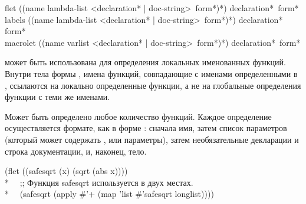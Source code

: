 \begin{defmac}
flet ({(name lambda-list
        <{declaration}* | doc-string> {\,form}*)}*)
     {declaration}* {\,form}* \\
labels ({(name lambda-list
          <{declaration}* | doc-string> {\,form}*)}*)
       {declaration}* {\,form}* \\
macrolet ({(name varlist
            <{declaration}* | doc-string> {\,form}*)}*)
         {declaration}* {\,form}*

 может быть использована для определения локальных именованных
функций. Внутри тела формы , имена функций, совпадающие с именами
определенными в , ссылаются на локально определенные функции, а не на
глобальные определения функции с теми же именами.

Может быть определено любое количество функций. Каждое определение
осуществляется формате, как в форме : сначала имя, затем список
параметров (который может содержать ,  или 
параметры), затем необязательные декларации и строка документации, и, наконец,
тело.
\begin{lisp}
(flet ((safesqrt (x) (sqrt (abs x)))) \\*
~~;; Функция safesqrt используется в двух местах. \\*
~~(safesqrt (apply \#'+ (map 'list \#'safesqrt longlist))))
\end{lisp}


\end{defmac}

